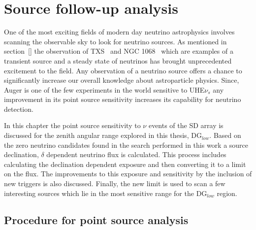 
\chapter{Source follow-up analysis}
\label{sec:MC}

One of the most exciting fields of modern day neutrino astrophysics involves scanning the observable sky to look for neutrino sources. As mentioned in section~\ref{} the observation of TXS~\cite{} and NGC 1068~\cite{} which are examples of a transient source and a steady state of neutrinos has brought unprecedented excitement to the field. Any observation of a neutrino source offers a chance to significantly increase our overall knowledge about astroparticle physics. Since, Auger is one of the few experiments in the world sensitive to UHE$\nu_s$ any improvement in its point source sensitivity increases its capability for neutrino detection. 

In this chapter the point source sensitivity to $\nu$ events of the SD array is discussed for the zenith angular range explored in this thesis, DG$_{low}$. Based on the zero neutrino candidates found in the search performed in this work a source declination, $\delta$ dependent neutrino flux is calculated. This process includes calculating the declination dependent exposure and then converting it to a limit on the flux. The improvements to this exposure and sensitivity by the inclusion of new triggers is also discussed. Finally, the new limit is used to scan a few interesting sources which lie in the most sensitive range for the DG$_{low}$ region.

\section{Procedure for point source analysis}
\label{sec:procedure_point_source}

